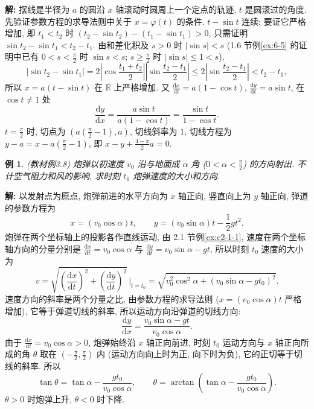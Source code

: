 \documentclass[UTF8,openany]{ctexbook}
\theoremstyle{chinesetextbook}
\newtheorem{example}{例}[section]
\newenvironment{cnsolution}{\par\indent\textbf{解:} \ignorespaces}{\par}
\newcommand{\dd}{\mathrm d}
\begin{document}
\begin{cnsolution}
摆线是半径为 $a$ 的圆沿 $x$ 轴滚动时圆周上一个定点的轨迹, $t$ 是圆滚过的角度. 先验证参数方程的求导法则中关于 $x=\varphi(t)$ 的条件. $t-\sin t$ 连续; 要证它严格增加, 即 $t_1<t_2$ 时 $(t_2-\sin t_2)-(t_1-\sin t_1)>0$, 只需证明 $\sin t_2-\sin t_1<t_2-t_1$. 由和差化积及 $s>0$ 时 $|\sin s|<s$ (1.6 节例\ref{ex:6-5} 的证明中已有 $\displaystyle0<s<\frac\pi2$ 时 $\sin s<s$; $\displaystyle s\ge\frac\pi2$ 时 $|\sin s|\le1<s$),
\[
|\sin t_2-\sin t_1|=2\left|\cos\frac{t_1+t_2}2\right|\left|\sin\frac{t_2-t_1}2\right|\le2\left|\sin\frac{t_2-t_1}2\right|<t_2-t_1,
\]
所以 $x=a(t-\sin t)$ 在 $\mathbb R$ 上严格增加. 又 $\displaystyle\frac{\dd x}{\dd t}=a(1-\cos t)$, $\displaystyle\frac{\dd y}{\dd t}=a\sin t$, 在 $\cos t\ne1$ 处
\[
\frac{\dd y}{\dd x}=\frac{a\sin t}{a(1-\cos t)}=\frac{\sin t}{1-\cos t}.
\]
$\displaystyle t=\frac\pi2$ 时, 切点为 $\displaystyle\left(a\left(\frac\pi2-1\right),a\right)$, 切线斜率为 $1$, 切线方程为 $\displaystyle y-a=x-a\left(\frac\pi2-1\right)$, 即 $\displaystyle x-y+\frac{4-\pi}2a=0$.
\end{cnsolution}
\begin{example}\label{ex:c2-3-8}
\textnormal{(教材例3.8)} 炮弹以初速度 $v_0$ 沿与地面成 $\alpha$ 角 ($\displaystyle0<\alpha<\frac\pi2$) 的方向射出. 不计空气阻力和风的影响, 求时刻 $t_0$ 炮弹速度的大小和方向.
\end{example}
\begin{cnsolution}
以发射点为原点, 炮弹前进的水平方向为 $x$ 轴正向, 竖直向上为 $y$ 轴正向, 弹道的参数方程为
\[
x=(v_0\cos\alpha)t,\qquad y=(v_0\sin\alpha)t-\frac12gt^2.
\]
炮弹在两个坐标轴上的投影各作直线运动, 由 2.1 节例\ref{ex:c2-1-1}, 速度在两个坐标轴方向的分量分别是 $\displaystyle\frac{\dd x}{\dd t}=v_0\cos\alpha$ 与 $\displaystyle\frac{\dd y}{\dd t}=v_0\sin\alpha-gt$, 所以时刻 $t_0$ 速度的大小为
\[
v=\sqrt{\left(\frac{\dd x}{\dd t}\right)^2+\left(\frac{\dd y}{\dd t}\right)^2}\,\Bigg|_{t=t_0}=\sqrt{v_0^2\cos^2\alpha+(v_0\sin\alpha-gt_0)^2}.
\]
速度方向的斜率是两个分量之比, 由参数方程的求导法则 ($x=(v_0\cos\alpha)t$ 严格增加), 它等于弹道切线的斜率, 所以运动方向沿弹道的切线方向:
\[
\frac{\dd y}{\dd x}=\frac{v_0\sin\alpha-gt}{v_0\cos\alpha}.
\]
由于 $\displaystyle\frac{\dd x}{\dd t}=v_0\cos\alpha>0$, 炮弹始终沿 $x$ 轴正向前进, 时刻 $t_0$ 运动方向与 $x$ 轴正向所成的角 $\theta$ 取在 $\displaystyle\left(-\frac\pi2,\frac\pi2\right)$ 内 (运动方向向上时为正, 向下时为负), 它的正切等于切线的斜率. 所以
\[
\tan\theta=\tan\alpha-\frac{gt_0}{v_0\cos\alpha},\qquad\theta=\arctan\left(\tan\alpha-\frac{gt_0}{v_0\cos\alpha}\right).
\]
$\theta>0$ 时炮弹上升, $\theta<0$ 时下降.
\end{cnsolution}
\end{document}
